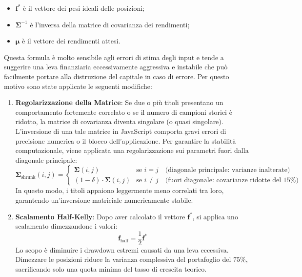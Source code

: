 \begin{itemize}
    \item $\mathbf{f}^*$ è il vettore dei pesi ideali delle posizioni;
    \item $\mathbf{\Sigma}^{-1}$ è l'inversa della matrice di covarianza dei rendimenti;
    \item $\boldsymbol{\mu}$ è il vettore dei rendimenti attesi.
\end{itemize}

Questa formula è molto sensibile agli errori di stima degli input e tende a suggerire una leva finanziaria eccessivamente aggressiva e instabile che può facilmente portare alla distruzione del capitale in caso di errore.
Per questo motivo sono state applicate le seguenti modifiche:

\begin{enumerate}
    \item \textbf{Regolarizzazione della Matrice}: Se due o più titoli presentano un comportamento fortemente correlato o se il numero di campioni storici è ridotto, la matrice di covarianza diventa singolare (o quasi singolare). 
    L'inversione di una tale matrice in JavaScript comporta gravi errori di precisione numerica o il blocco dell'applicazione. 
    Per garantire la stabilità computazionale, viene applicata una regolarizzazione sui parametri fuori dalla diagonale principale:
    \begin{equation}
        \mathbf{\Sigma}_{\text{shrunk}}(i, j) = 
        \begin{cases} 
            \mathbf{\Sigma}(i, j) & \text{se } i = j \quad \text{(diagonale principale: varianze inalterate)} \\ 
            (1 - \delta) \cdot \mathbf{\Sigma}(i, j) & \text{se } i \neq j \quad \text{(fuori diagonale: covarianze ridotte del } 15\% \text{)}
        \end{cases}
    \end{equation}
    In questo modo, i titoli appaiono leggermente meno correlati tra loro, garantendo un'inversione matriciale numericamente stabile.

    \item \textbf{Scalamento Half-Kelly}: Dopo aver calcolato il vettore $\mathbf{f}^*$, si applica uno scalamento dimezzandone i valori:
    \begin{equation}
        \mathbf{f}_{\text{half}} = \frac{1}{2} \mathbf{f}^*
    \end{equation}
    Lo scopo è diminuire i drawdown estremi causati da una leva eccessiva. Dimezzare le posizioni riduce la varianza complessiva del portafoglio del $75\%$, sacrificando solo una quota minima del tasso di crescita teorico.


\end{enumerate}
